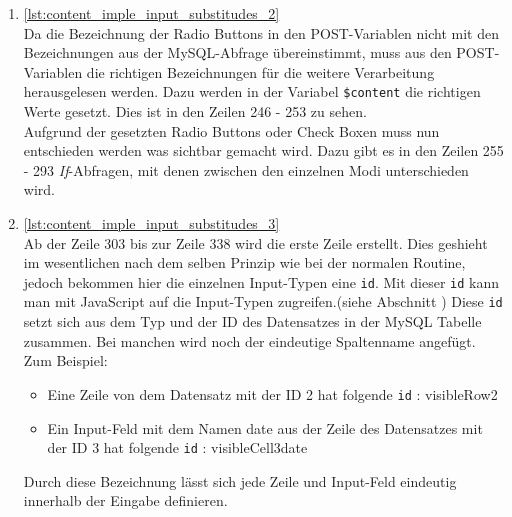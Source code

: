 \begin{enumerate}
	\item \autoref{lst:content_imple_input_substitudes_2}\\
	Da die Bezeichnung der Radio Buttons in den POST-Variablen nicht mit den Bezeichnungen aus der MySQL-Abfrage übereinstimmt, muss aus den POST-Variablen die richtigen Bezeichnungen für die weitere Verarbeitung herausgelesen werden. Dazu werden in der Variabel \texttt{\$content} die richtigen Werte gesetzt. Dies ist in den Zeilen 246 - 253 zu sehen.\\
	Aufgrund der gesetzten Radio Buttons oder Check Boxen muss nun entschieden werden was sichtbar gemacht wird. Dazu gibt es in den Zeilen 255 - 293 \textit{If}-Abfragen, mit denen zwischen den einzelnen Modi unterschieden wird.\\ 
	
	
	\item \autoref{lst:content_imple_input_substitudes_3}\\
	Ab der Zeile 303 bis zur Zeile 338 wird die erste Zeile erstellt. Dies geshieht im wesentlichen nach dem selben Prinzip wie bei der normalen Routine, jedoch bekommen hier die einzelnen Input-Typen eine \texttt{id}. Mit dieser \texttt{id} kann man mit JavaScript auf die Input-Typen zugreifen.(siehe Abschnitt ) Diese \texttt{id} setzt sich aus dem Typ und der ID des Datensatzes in der MySQL Tabelle zusammen. Bei manchen wird noch der eindeutige Spaltenname angefügt.\\
	Zum Beispiel:
	\begin{itemize}
		\item Eine Zeile von dem Datensatz mit der ID 2 hat folgende \texttt{id} : visibleRow2
		\item Ein Input-Feld mit dem Namen date aus der Zeile des Datensatzes mit der ID 3 hat folgende \texttt{id} : visibleCell3date
	\end{itemize}
	Durch diese Bezeichnung lässt sich jede Zeile und Input-Feld eindeutig innerhalb der Eingabe definieren.\\
	
	
	

\end{enumerate}

